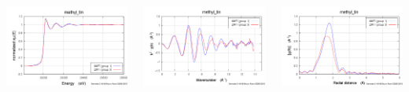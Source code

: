 \documentclass[10pt, xcolor=x11names, compress]{beamer}
\begin{document}
\begin{frame}
\begin{columns}
\begin{column}{0.33\linewidth}
      \includegraphics[width=\linewidth]{images/mtin_mu.png}
    \end{column}
    \begin{column}{0.33\linewidth}
      \includegraphics[width=\linewidth]{images/mtin_chik.png}
    \end{column}
    \begin{column}{0.33\linewidth}
      \includegraphics[width=\linewidth]{images/mtin_chir.png}
    \end{column}
  \end{columns}
\end{frame}
\end{document}
